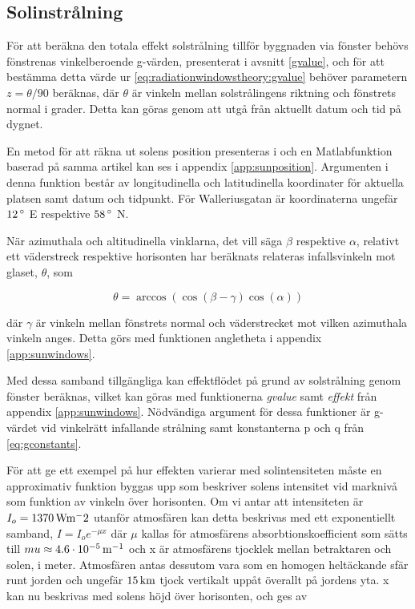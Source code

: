 \subsection{Solinstrålning}
För att beräkna den totala effekt solstrålning tillför byggnaden via fönster behövs fönstrenas vinkelberoende g-värden, presenterat i avsnitt \ref{gvalue}, och för att bestämma detta värde ur \eqref{eq:radiationwindowstheory:gvalue} behöver parametern $z = \theta/90$ beräknas, där $\theta$ är vinkeln mellan solstrålingens riktning och fönstrets normal i grader. Detta kan göras genom att utgå från aktuellt datum och tid på dygnet.

En metod för att räkna ut solens position presenteras i \cite{walraven78} och en Matlabfunktion baserad på samma artikel kan ses i appendix \ref{app:sunposition}. Argumenten i denna funktion består av longitudinella och latitudinella koordinater för aktuella platsen samt datum och tidpunkt. För Walleriusgatan är koordinaterna ungefär $\unit[12]{^\circ}$ E respektive $\unit[58]{^\circ}$ N.

När azimuthala och altitudinella vinklarna, det vill säga $\beta$ respektive $\alpha$, relativt ett väderstreck respektive horisonten har beräknats relateras infallsvinkeln mot glaset, $\theta$, som

\begin{equation} 
\theta = \arccos{\left( \cos{\left(\beta - \gamma\right)}\cos{\left(\alpha\right)}\right)}
\end{equation}

där $\gamma$ är vinkeln mellan fönstrets normal och väderstrecket mot vilken azimuthala vinkeln anges. Detta görs med funktionen angletheta i appendix \ref{app:sunwindows}.

Med dessa samband tillgängliga kan effektflödet på grund av solstrålning genom fönster beräknas, vilket kan göras med funktionerna \textit{gvalue} samt \textit{effekt} från appendix \ref{app:sunwindows}. Nödvändiga argument för dessa funktioner är g-värdet vid vinkelrätt infallande strålning samt konstanterna p och q från \eqref{eq:gconstants}. %

För att ge ett exempel på hur effekten varierar med solintensiteten måste en approximativ funktion byggas upp som beskriver solens intensitet vid marknivå som funktion av vinkeln över horisonten. Om vi antar att intensiteten är $I_o = \unit[1370]{Wm^-2}$ utanför atmosfären kan detta beskrivas med ett exponentiellt samband, $I = I_oe^{-\mu x}$ där $\mu$ kallas för atmosfärens absorbtionskoefficient som sätts till $mu\approx \unit[4.6\cdot 10^{-5}]{m^{-1}}$ och x är atmosfärens tjocklek mellan betraktaren och solen, i meter. Atmosfären antas dessutom vara som en homogen heltäckande sfär runt jorden och ungefär $\unit[15]{km}$ tjock vertikalt uppåt överallt på jordens yta. x kan nu beskrivas med solens höjd över horisonten, och ges av

